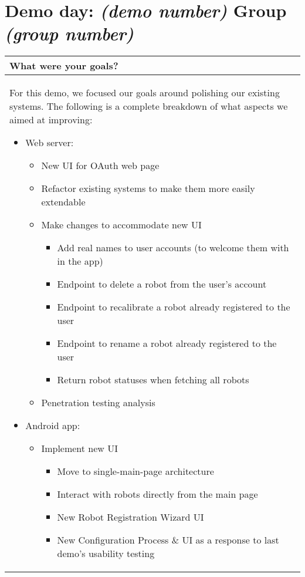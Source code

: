 \documentclass[a4paper]{article}
\newcommand{\colWidth}{141mm}
\begin{document}
 
\section*{Demo day: \textit{(demo number)} Group \textit{(group number)}}


\begin{center}
\begin{tabular}{|p{\colWidth}|}
	\hline
	\cellcolor{blue!25}\large
	\textbf{What were your goals?}
	\\ \hline
	
		For this demo, we focused our goals around polishing our existing systems.
		The following is a complete breakdown of what aspects we aimed at improving:
		\begin{itemize}
			\item Web server:
			\begin{itemize}
				\item New UI for OAuth web page
				\item Refactor existing systems to make them more easily extendable
				\item Make changes to accommodate new UI
				\begin{itemize}
					\item Add real names to user accounts (to welcome them with in the app)
					\item Endpoint to delete a robot from the user's account
					\item Endpoint to recalibrate a robot already registered to the user
					\item Endpoint to rename a robot already registered to the user
					\item Return robot statuses when fetching all robots
				\end{itemize}
				\item Penetration testing analysis
			\end{itemize}
			\item Android app:
			\begin{itemize}
				\item Implement new UI
				\begin{itemize}
					\item Move to single-main-page architecture
					\item Interact with robots directly from the main page
					\item New Robot Registration Wizard UI
					\item New Configuration Process \& UI as a response to last demo's usability testing

\end{itemize}
\end{itemize}
\end{itemize}
\end{tabular}
\end{center}
\end{document}
